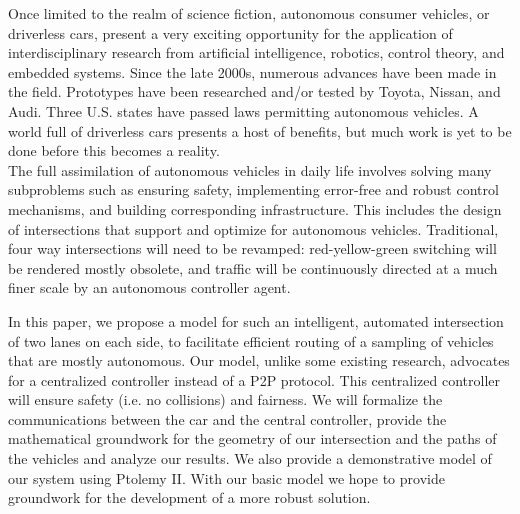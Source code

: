 Once limited to the realm of science fiction, autonomous consumer vehicles, or driverless cars, present a very exciting opportunity for the application of interdisciplinary research from artificial intelligence, robotics, control theory, and embedded systems. Since the late 2000s, numerous advances have been made in the field. Prototypes have been researched and/or tested by Toyota, Nissan, and Audi. Three U.S. states have passed laws permitting autonomous vehicles. A world full of driverless cars presents a host of benefits, but much work is yet to be done before this becomes a reality.\\
The full assimilation of autonomous vehicles in daily life involves solving many subproblems such as ensuring safety, implementing error-free and robust control mechanisms, and building corresponding infrastructure. This includes the design of intersections that support and optimize for autonomous vehicles.  Traditional, four way intersections will need to be revamped: red-yellow-green switching will be rendered mostly obsolete, and traffic will be continuously directed at a much finer scale by an autonomous controller agent.

In this paper, we propose a model for such an intelligent, automated intersection of two lanes on each side, to facilitate efficient routing of a sampling of vehicles that are mostly autonomous. Our model, unlike some existing research, advocates for a centralized controller instead of a P2P protocol. This centralized controller will ensure safety (i.e. no collisions) and fairness. We will formalize the communications between the car and the central controller, provide the mathematical groundwork for the geometry of our intersection and the paths of the vehicles and analyze our results. We also provide a demonstrative model of our system using Ptolemy II. With our basic model we hope to provide groundwork for the development of a more robust solution. 

